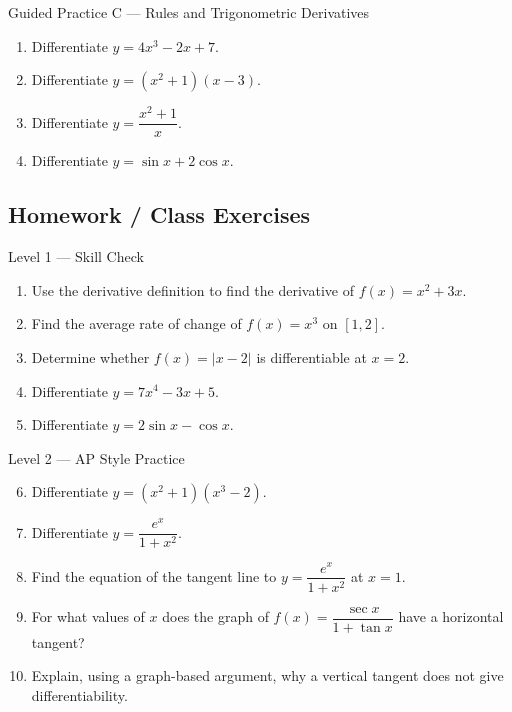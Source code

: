 \documentclass[11pt]{article}
\begin{document}
\begin{practicebox}{Guided Practice C --- Rules and Trigonometric Derivatives}
\begin{enumerate}
    \item Differentiate $y=4x^3-2x+7$.
    \item Differentiate $y=(x^2+1)(x-3)$.
    \item Differentiate $y=\dfrac{x^2+1}{x}$.
    \item Differentiate $y=\sin x+2\cos x$.
\end{enumerate}
\end{practicebox}

\newpage
\subsection{Homework / Class Exercises}

\begin{practicebox}{Level 1 --- Skill Check}
\begin{enumerate}
    \item Use the derivative definition to find the derivative of $f(x)=x^2+3x$.
    \item Find the average rate of change of $f(x)=x^3$ on $[1,2]$.
    \item Determine whether $f(x)=|x-2|$ is differentiable at $x=2$.
    \item Differentiate $y=7x^4-3x+5$.
    \item Differentiate $y=2\sin x-\cos x$.
\end{enumerate}
\end{practicebox}

\begin{practicebox}{Level 2 --- AP Style Practice}
\begin{enumerate}
    \setcounter{enumi}{5}
    \item Differentiate $y=(x^2+1)(x^3-2)$.
    \item Differentiate $y=\dfrac{e^x}{1+x^2}$.
    \item Find the equation of the tangent line to $y=\dfrac{e^x}{1+x^2}$ at $x=1$.
    \item For what values of $x$ does the graph of $f(x)=\dfrac{\sec x}{1+\tan x}$ have a horizontal tangent?
    \item Explain, using a graph-based argument, why a vertical tangent does not give differentiability.
\end{enumerate}
\end{practicebox}
\end{document}
